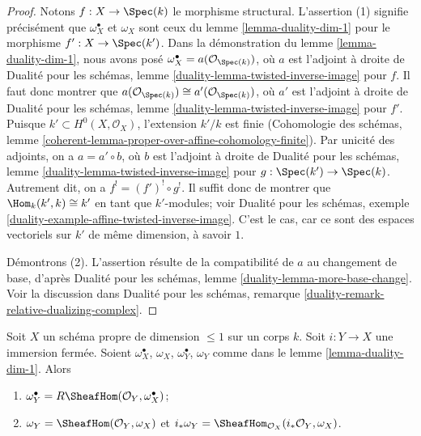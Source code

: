 \begin{proof}
Notons $f : X \to \Spec(k)$ le morphisme structural. L'assertion (1) signifie précisément que $\omega_X^\bullet$ et $\omega_X$ sont ceux du lemme \ref{lemma-duality-dim-1} pour le morphisme $f' : X \to \Spec(k')$. Dans la démonstration du lemme \ref{lemma-duality-dim-1}, nous avons posé $\omega_X^\bullet = a(\mathcal{O}_{\Spec(k)})$, où $a$ est l'adjoint à droite de Dualité pour les schémas, lemme \ref{duality-lemma-twisted-inverse-image} pour $f$. Il faut donc montrer que $a(\mathcal{O}_{\Spec(k)}) \cong a'(\mathcal{O}_{\Spec(k)})$, où $a'$ est l'adjoint à droite de Dualité pour les schémas, lemme \ref{duality-lemma-twisted-inverse-image} pour $f'$. Puisque $k' \subset H^0(X, \mathcal{O}_X)$, l'extension $k'/k$ est finie (Cohomologie des schémas, lemme \ref{coherent-lemma-proper-over-affine-cohomology-finite}). Par unicité des adjoints, on a $a = a' \circ b$, où $b$ est l'adjoint à droite de Dualité pour les schémas, lemme \ref{duality-lemma-twisted-inverse-image} pour $g : \Spec(k') \to \Spec(k)$. Autrement dit, on a $f^! = (f')^! \circ g^!$. Il suffit donc de montrer que $\Hom_k(k', k) \cong k'$ en tant que $k'$-modules; voir Dualité pour les schémas, exemple \ref{duality-example-affine-twisted-inverse-image}. C'est le cas, car ce sont des espaces vectoriels sur $k'$ de même dimension, à savoir $1$.

\medskip\noindent
Démontrons (2). L'assertion résulte de la compatibilité de $a$ au changement de base, d'après Dualité pour les schémas, lemme \ref{duality-lemma-more-base-change}. Voir la discussion dans Dualité pour les schémas, remarque \ref{duality-remark-relative-dualizing-complex}.
\end{proof}

\begin{lemma}
\label{lemma-closed-immersion-dim-1-CM}
Soit $X$ un schéma propre de dimension $\leq 1$ sur un corps $k$. Soit $i : Y \to X$ une immersion fermée. Soient $\omega_X^\bullet$, $\omega_X$, $\omega_Y^\bullet$, $\omega_Y$ comme dans le lemme \ref{lemma-duality-dim-1}. Alors \begin{enumerate} \item $\omega_Y^\bullet = R\SheafHom(\mathcal{O}_Y, \omega_X^\bullet)$; \item $\omega_Y = \SheafHom(\mathcal{O}_Y, \omega_X)$ et $i_*\omega_Y = \SheafHom_{\mathcal{O}_X}(i_*\mathcal{O}_Y, \omega_X)$.
\end{enumerate}
\end{lemma}


